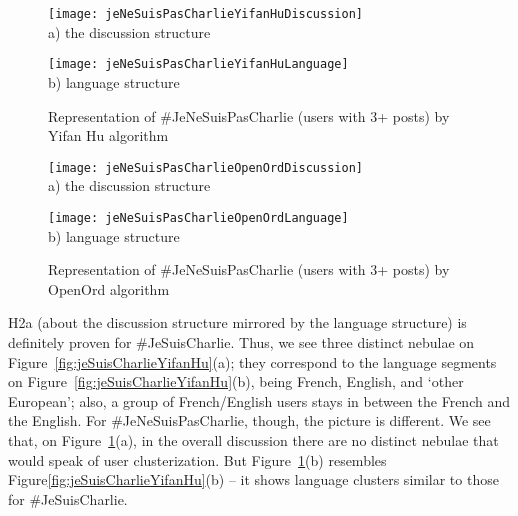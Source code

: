 \pagebreak

\begin{figure}[ht]
	\begin{minipage}[b][][b]{0.49\linewidth}\centering
		\texttt{[image: jeNeSuisPasCharlieYifanHuDiscussion]} \\ a) the discussion structure
	\end{minipage}
	\hfill
	\begin{minipage}[b][][b]{0.49\linewidth}\centering
		\texttt{[image: jeNeSuisPasCharlieYifanHuLanguage]} \\ b) language structure
	\end{minipage}
	\caption{Representation of \#JeNeSuisPasCharlie (users with 3+ posts) by Yifan Hu algorithm}
	\label{fig:jeNeSuisPasCharlieYifanHu}
\end{figure}

\begin{figure}[ht]
	\begin{minipage}[b][][b]{0.49\linewidth}\centering
		\texttt{[image: jeNeSuisPasCharlieOpenOrdDiscussion]} \\ a) the discussion structure
	\end{minipage}
	\hfill
	\begin{minipage}[b][][b]{0.49\linewidth}\centering
		\texttt{[image: jeNeSuisPasCharlieOpenOrdLanguage]} \\ b) language structure
	\end{minipage}
	\caption{Representation of \#JeNeSuisPasCharlie (users with 3+ posts) by OpenOrd algorithm}
	\label{fig:jeNeSuisPasCharlieOpenOrd}
\end{figure}

H2a (about the discussion structure mirrored by the language structure) is definitely proven for \#JeSuisCharlie. Thus, we see three distinct nebulae on Figure~\cref{fig:jeSuisCharlieYifanHu}(a); they correspond to the language segments on Figure~\cref{fig:jeSuisCharlieYifanHu}(b), being French, English, and ‘other European’; also, a group of French/English users stays in between the French and the English. For \#JeNeSuisPasCharlie, though, the picture is different. We see that, on Figure~\cref{fig:jeNeSuisPasCharlieYifanHu}(a), in the overall discussion there are no distinct nebulae that would speak of user clusterization. But Figure~\cref{fig:jeNeSuisPasCharlieYifanHu}(b) resembles Figure\cref{fig:jeSuisCharlieYifanHu}(b) -- it shows language clusters similar to those for \#JeSuisCharlie.

